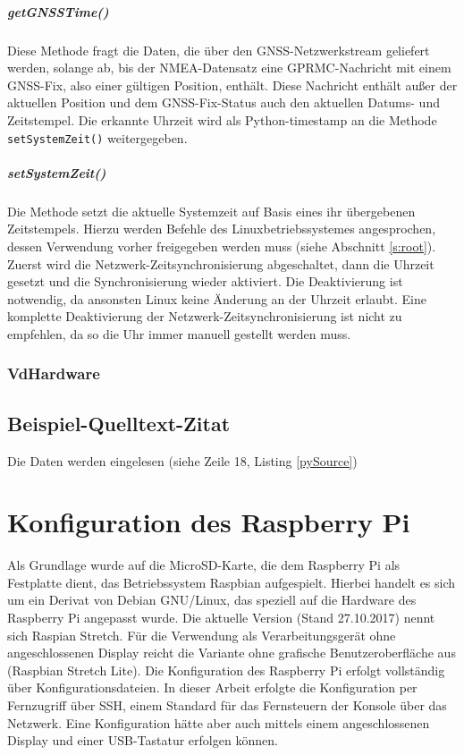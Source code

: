 \documentclass[a4paper,12pt,bibliography=totoc, listof=totoc,titlepage]{scrreprt}
\newcommand{\code}[1]{\texttt{#1}}
\begin{document}
\paragraph{getGNSSTime()}
Diese Methode fragt die Daten, die über den GNSS-Netzwerkstream geliefert werden, solange ab, bis der NMEA-Datensatz eine GPRMC-Nachricht mit einem GNSS-Fix, also einer gültigen Position, enthält. Diese Nachricht enthält außer der aktuellen Position und dem GNSS-Fix-Status auch den aktuellen Datums- und Zeitstempel. Die erkannte Uhrzeit wird als Python-timestamp an die Methode \code{setSystemZeit()} weitergegeben.

\paragraph{setSystemZeit()}
Die Methode setzt die aktuelle Systemzeit auf Basis eines ihr übergebenen Zeitstempels. Hierzu werden Befehle des Linuxbetriebssystemes angesprochen, dessen Verwendung vorher freigegeben werden muss (siehe Abschnitt \ref{s:root}). Zuerst wird die Netzwerk-Zeitsynchronisierung abgeschaltet, dann die Uhrzeit gesetzt und die Synchronisierung wieder aktiviert. Die Deaktivierung ist notwendig, da ansonsten Linux keine Änderung an der Uhrzeit erlaubt. Eine komplette Deaktivierung der Netzwerk-Zeitsynchronisierung ist nicht zu empfehlen, da so die Uhr immer manuell gestellt werden muss.

\subsection{VdHardware}



\section{Beispiel-Quelltext-Zitat}

Die Daten werden eingelesen (siehe Zeile 18, Listing \ref{pySource})




\chapter{Konfiguration des Raspberry Pi}

Als Grundlage wurde auf die MicroSD-Karte, die dem Raspberry Pi als Festplatte dient, das Betriebssystem Raspbian aufgespielt. Hierbei handelt es sich um ein Derivat von Debian GNU/Linux, das speziell auf die Hardware des Raspberry Pi angepasst wurde. Die aktuelle Version (Stand 27.10.2017) nennt sich Raspian Stretch. Für die Verwendung als Verarbeitungsgerät ohne angeschlossenen Display reicht die Variante ohne grafische Benutzeroberfläche aus (Raspbian Stretch Lite). Die Konfiguration des Raspberry Pi erfolgt vollständig über Konfigurationsdateien. In dieser Arbeit erfolgte die Konfiguration per Fernzugriff über SSH, einem Standard für das Fernsteuern der Konsole über das Netzwerk. Eine Konfiguration hätte aber auch mittels einem angeschlossenen Display und einer USB-Tastatur erfolgen können.
\end{document}
